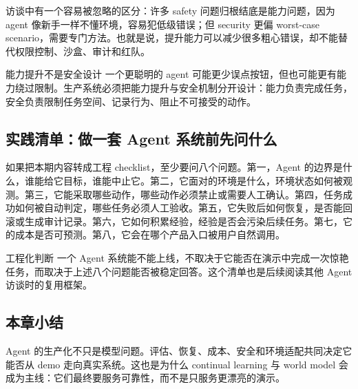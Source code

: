 访谈中有一个容易被忽略的区分：许多 safety 问题归根结底是能力问题，因为 agent 像新手一样不懂环境，容易犯低级错误；但 security 更偏 worst-case scenario，需要专门方法。也就是说，提升能力可以减少很多粗心错误，却不能替代权限控制、沙盒、审计和红队。

\begin{warningbox}{能力提升不是安全设计}
一个更聪明的 agent 可能更少误点按钮，但也可能更有能力绕过限制。生产系统必须把能力提升与安全机制分开设计：能力负责完成任务，安全负责限制任务空间、记录行为、阻止不可接受的动作。
\end{warningbox}


\subsection{实践清单：做一套 Agent 系统前先问什么}

如果把本期内容转成工程 checklist，至少要问八个问题。第一，Agent 的边界是什么，谁能给它目标，谁能中止它。第二，它面对的环境是什么，环境状态如何被观测。第三，它能采取哪些动作，哪些动作必须禁止或需要人工确认。第四，任务成功如何被自动判定，哪些任务必须人工验收。第五，它失败后如何恢复，是否能回滚或生成审计记录。第六，它如何积累经验，经验是否会污染后续任务。第七，它的成本是否可预测。第八，它会在哪个产品入口被用户自然调用。

\begin{importantbox}{工程化判断}
一个 Agent 系统能不能上线，不取决于它能否在演示中完成一次惊艳任务，而取决于上述八个问题能否被稳定回答。这个清单也是后续阅读其他 Agent 访谈时的复用框架。
\end{importantbox}

\subsection{本章小结}

Agent 的生产化不只是模型问题。评估、恢复、成本、安全和环境适配共同决定它能否从 demo 走向真实系统。这也是为什么 continual learning 与 world model 会成为主线：它们最终要服务可靠性，而不是只服务更漂亮的演示。


